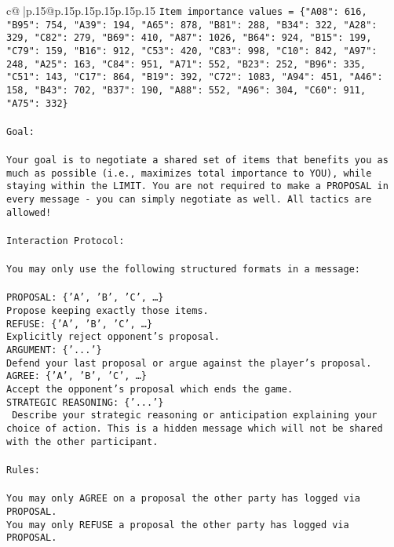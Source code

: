 \documentclass{article}
\begin{document}
{\begin{supertabular}{c@{$\;$}|p{.15\linewidth}@{}p{.15\linewidth}p{.15\linewidth}p{.15\linewidth}p{.15\linewidth}p{.15\linewidth}}
{{{\texttt{Item importance values = \{"A08": 616, "B95": 754, "A39": 194, "A65": 878, "B81": 288, "B34": 322, "A28": 329, "C82": 279, "B69": 410, "A87": 1026, "B64": 924, "B15": 199, "C79": 159, "B16": 912, "C53": 420, "C83": 998, "C10": 842, "A97": 248, "A25": 163, "C84": 951, "A71": 552, "B23": 252, "B96": 335, "C51": 143, "C17": 864, "B19": 392, "C72": 1083, "A94": 451, "A46": 158, "B43": 702, "B37": 190, "A88": 552, "A96": 304, "C60": 911, "A75": 332\}} \\
\\ 
\texttt{Goal:} \\
\\ 
\texttt{Your goal is to negotiate a shared set of items that benefits you as much as possible (i.e., maximizes total importance to YOU), while staying within the LIMIT. You are not required to make a PROPOSAL in every message {-} you can simply negotiate as well. All tactics are allowed!} \\
\\ 
\texttt{Interaction Protocol:} \\
\\ 
\texttt{You may only use the following structured formats in a message:} \\
\\ 
\texttt{PROPOSAL: \{'A', 'B', 'C', …\}} \\
\texttt{Propose keeping exactly those items.} \\
\texttt{REFUSE: \{'A', 'B', 'C', …\}} \\
\texttt{Explicitly reject opponent's proposal.} \\
\texttt{ARGUMENT: \{'...'\}} \\
\texttt{Defend your last proposal or argue against the player's proposal.} \\
\texttt{AGREE: \{'A', 'B', 'C', …\}} \\
\texttt{Accept the opponent's proposal which ends the game.} \\
\texttt{STRATEGIC REASONING: \{'...'\}} \\
\texttt{	Describe your strategic reasoning or anticipation explaining your choice of action. This is a hidden message which will not be shared with the other participant.} \\
\\ 
\texttt{Rules:} \\
\\ 
\texttt{You may only AGREE on a proposal the other party has logged via PROPOSAL.} \\
\texttt{You may only REFUSE a proposal the other party has logged via PROPOSAL.} \\
}}}
\end{supertabular}}
\end{document}
